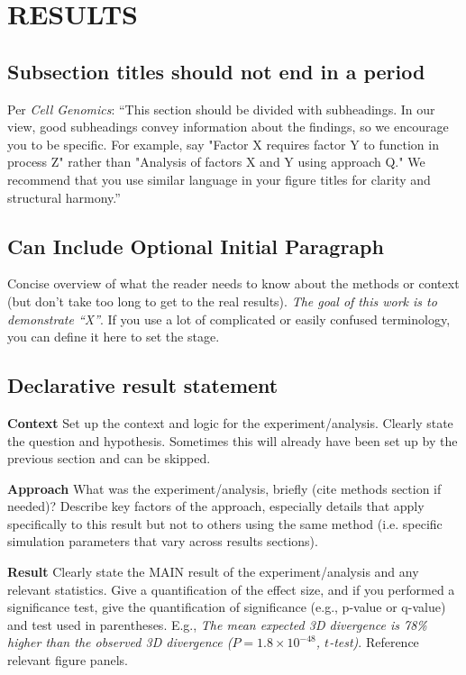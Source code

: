 
\section{RESULTS}
\resultsTips %
\subsection{Subsection titles should not end in a period}
Per \textit{Cell Genomics}: ``This section should be divided with subheadings. In our view, good subheadings convey information about the findings, so we encourage you to be specific. For example, say "Factor X requires factor Y to function in process Z" rather than "Analysis of factors X and Y using approach Q." We recommend that you use similar language in your figure titles for clarity and structural harmony.''

\subsection{Can Include Optional Initial Paragraph} 
Concise overview of what the reader needs to know about the methods or context (but don’t take too long to get to the real results). \textit{The goal of this work is to demonstrate “X”}. If you use a lot of complicated or easily confused terminology, you can define it here to set the stage. 

\subsection{Declarative result statement}
\textbf{Context} Set up the context and logic for the experiment/analysis. Clearly state the question and hypothesis. Sometimes this will already have been set up by the previous section and can be skipped.

\noindent\textbf{Approach} What was the experiment/analysis, briefly (cite methods section if needed)? Describe key factors of the approach, especially details that apply specifically to this result but not to others using the same method (i.e. specific simulation parameters that vary across results sections).

\noindent\textbf{Result} Clearly state the MAIN result of the experiment/analysis and any relevant statistics. Give a quantification of the effect size, and if you performed a significance test, give the quantification of significance (e.g., p-value or q-value) and test used in parentheses. E.g., \textit{The mean expected 3D divergence is 78\% higher than the observed 3D divergence ($P = 1.8\times10^{-48}$, $t$-test)}. Reference relevant figure panels.

